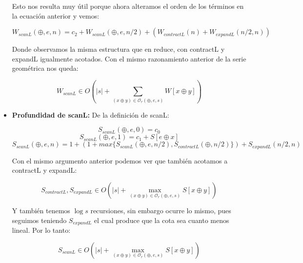\documentclass[12pt]{article}
\begin{document}
\begin{itemize}
    Esto nos resulta muy útil porque ahora alteramos el orden de los términos en la ecuación anterior y vemos:
    
    $$ W_{scanL}(\oplus, e, n) = c_2 + W_{scanL}(\oplus, e, n/2) + ( W_{contractL}(n) + W_{expandL}(n/2, n) ) $$
    
    Donde observamos la misma estructura que en reduce, con contractL y expandL igualmente acotados. Con el mismo razonamiento anterior de la serie geométrica nos queda:
    
    $$ W_{scanL} \in O(|s| + \sum\limits_{(x\oplus y)\in\mathcal{O}_r(\oplus,e,s)} W[x\oplus y]) $$
    

\item \textbf{Profundidad de scanL:}
    De la definición de scanL:
    
    $$ S_{scanL}(\oplus, e, 0) = c_0 $$
    $$ S_{scanL}(\oplus, e, 1) = c_1 + S[e \oplus x]  $$
    $$ S_{scanL}(\oplus, e, n) = 1 + ( 1 + max\{ S_{scanL}(\oplus, e, n/2), S_{contractL}(\oplus, n/2) \} ) + S_{expandL}(n/2, n) $$
    
    Con el mismo argumento anterior podemos ver que también acotamos a contractL y expandL:
    
    $$ S_{contractL}, S_{expandL} \in O(|s| + \max\limits_{(x\oplus y)\in\mathcal{O}_r(\oplus,e,s)} S[x\oplus y]) $$
    
    Y también tenemos $\log s$ recursiones, sin embargo ocurre lo mismo, pues seguimos teniendo $S_{expandL}$ el cual produce que la cota sea cuanto menos lineal. Por lo tanto:
    
    $$ S_{scanL} \in O(|s| + \max\limits_{(x\oplus y)\in\mathcal{O}_r(\oplus,e,s)} S[x\oplus y]) $$
    
\end{itemize}
\end{document}
